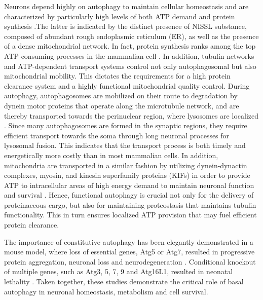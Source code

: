 Neurons depend highly on autophagy to maintain cellular homeostasis and are characterized by particularly high levels of both ATP demand and protein synthesis \citep{Meijer2009,Son2012}.The latter is indicated by the distinct presence of NISSL substance, composed of abundant rough endoplasmic reticulum (ER), as well as the presence of a dense mitochondrial network. In fact, protein synthesis ranks among the top ATP-consuming processes in the mammalian cell 
\citep{Buttgereit1995}. In addition, tubulin networks and ATP-dependent transport systems control not only autophagosomal but also mitochondrial mobility. This dictates the requirements for a high protein clearance system and a highly functional mitochondrial quality control. During autophagy, autophagosomes are mobilized on their route to degradation by dynein motor proteins that operate along the microtubule network, and are thereby transported towards the perinuclear region, where lysosomes are localized \citep{Fass2006,Jahreiss2008,Kimura2008}. Since many autophagosomes are formed in the synaptic regions, they require efficient transport towards the soma through long neuronal processes for lysosomal fusion. This indicates that the transport process is both timely and energetically more costly than in most mammalian cells. In addition, mitochondria are transported in a similar fashion by utilizing dynein-dynactin complexes, myosin, and kinesin superfamily proteins (KIFs) in order to provide ATP to intracellular areas of high energy demand to maintain neuronal function and survival \citep{Lin2015,Sheng2012}. Hence, functional autophagy is crucial not only for the delivery of proteinaceous cargo, but also for maintaining proteostasis that maintains tubulin functionality. This in turn ensures localized ATP provision that may fuel efficient protein clearance. 

The importance of constitutive autophagy has been elegantly demonstrated in a mouse model, where loss of essential genes, Atg5 or Atg7, resulted in progressive protein aggregation, neuronal loss and neurodegeneration \citep{Hara2006,Komatsu2006}. Conditional knockout of multiple genes, such as Atg3, 5, 7, 9 and Atg16L1, resulted in neonatal lethality \citep{Mizushima2010}. Taken together, these studies demonstrate the critical role of basal autophagy in neuronal homeostasis, metabolism and cell survival. 

